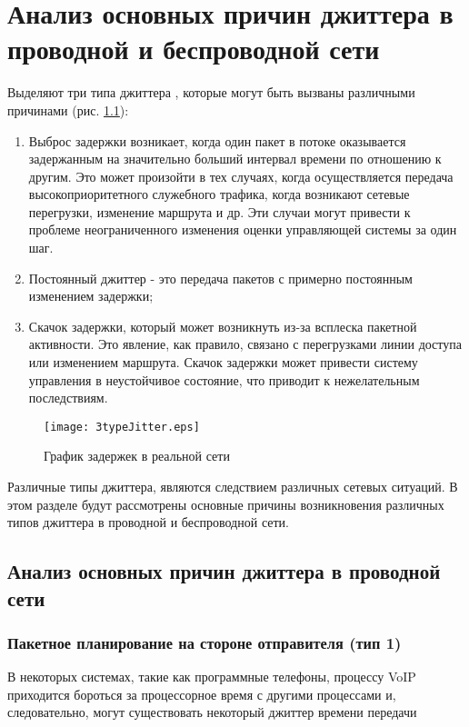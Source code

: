 \chapter{Анализ основных причин джиттера в проводной и беспроводной сети} \label{chapt2}
Выделяют три типа джиттера \cite{clark}, которые могут быть вызваны различными причинами (рис. \ref{img:3typeJitter}):
\begin{enumerate}
  \item Выброс задержки возникает, когда один пакет в потоке оказывается задержанным на значительно больший интервал времени по отношению к другим. Это может произойти в тех случаях, когда осуществляется передача высокоприоритетного служебного трафика, когда возникают сетевые перегрузки, изменение маршрута и др. Эти случаи могут привести к проблеме неограниченного изменения оценки управляющей системы за один шаг.
  \item Постоянный джиттер - это передача пакетов с примерно постоянным изменением задержки;
  \item Скачок задержки, который может возникнуть из-за всплеска пакетной активности. Это явление, как правило, связано с перегрузками линии доступа или изменением маршрута. Скачок задержки может привести систему управления в неустойчивое состояние, что приводит к нежелательным последствиям.
\end{enumerate}

\begin{figure} [h] 
  \center
\texttt{[image: 3typeJitter.eps]}
  \caption{График задержек в реальной сети \cite{clark}} 
  \label{img:3typeJitter}  
\end{figure}
Различные типы джиттера, являются следствием различных сетевых ситуаций. В этом разделе будут рассмотрены основные причины возникновения различных типов джиттера в проводной и беспроводной сети.

\section{Анализ основных причин джиттера в проводной сети} \label{sect2_1}
\subsection{Пакетное планирование на стороне отправителя (тип 1)} \label{subsect2_1_1}
В некоторых системах, такие как программные телефоны, процессу VoIP приходится бороться за процессорное время с другими процессами и, следовательно, могут существовать некоторый джиттер времени передачи
